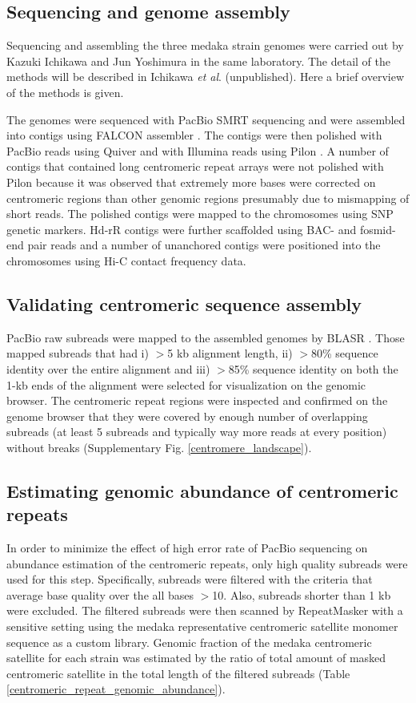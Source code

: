 \subsection*{Sequencing and genome assembly}
  Sequencing and assembling the three medaka strain genomes were carried out by Kazuki Ichikawa and Jun Yoshimura in the same laboratory. The detail of the methods will be described in Ichikawa \textit{et al}. (unpublished). Here a brief overview of the methods is given.

  The genomes were sequenced with PacBio SMRT sequencing and were assembled into contigs using FALCON assembler \cite{}. The contigs were then polished with PacBio reads using Quiver \cite{} and with Illumina reads using Pilon \cite{}. A number of contigs that contained long centromeric repeat arrays were not polished with Pilon because it was observed that extremely more bases were corrected on centromeric regions than other genomic regions presumably due to mismapping of short reads. The polished contigs were mapped to the chromosomes using SNP genetic markers. Hd-rR contigs were further scaffolded using BAC- and fosmid-end pair reads and a number of unanchored contigs were positioned into the chromosomes using Hi-C contact frequency data.


\subsection*{Validating centromeric sequence assembly}
  PacBio raw subreads were mapped to the assembled genomes by BLASR \cite{}. Those mapped subreads that had i) $>$5 kb alignment length, ii) $>$80\% sequence identity over the entire alignment and iii) $>$85\% sequence identity on both the 1-kb ends of the alignment were selected for visualization on the genomic browser. The centromeric repeat regions were inspected and confirmed on the genome browser that they were covered by enough number of overlapping subreads (at least 5 subreads and typically way more reads at every position) without breaks (Supplementary Fig. \ref{centromere_landscape}).


\subsection*{Estimating genomic abundance of centromeric repeats}
  In order to minimize the effect of high error rate of PacBio sequencing on abundance estimation of the centromeric repeats, only high quality subreads were used for this step. Specifically, subreads were filtered with the criteria that average base quality over the all bases $>$10. Also, subreads shorter than 1 kb were excluded. The filtered subreads were then scanned by RepeatMasker with a sensitive setting using the medaka representative centromeric satellite monomer sequence as a custom library. Genomic fraction of the medaka centromeric satellite for each strain was estimated by the ratio of total amount of masked centromeric satellite in the total length of the filtered subreads (Table \ref{centromeric_repeat_genomic_abundance}).


